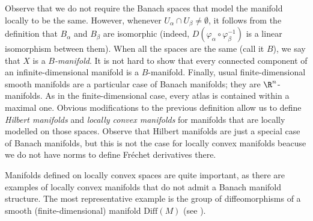 Observe that we do not require the Banach spaces that model the manifold locally to be the same. However, whenever \(U_\alpha \cap U_\beta \neq \emptyset\), it follows from the definition that \(B_\alpha\) and \(B_\beta\) are isomorphic (indeed, \(D(\varphi_\alpha \circ \varphi_\beta^{-1})\) is a linear isomorphism between them). When all the spaces are the same (call it \(B\)), we say that \(X\) is a \textit{\(B\)-manifold}. It is not hard to show that every connected component of an infinite-dimensional manifold is a \(B\)-manifold. Finally, usual finite-dimensional smooth manifolds are a particular case of Banach manifolds; they are \(\R^n\)-manifolds. As in the finite-dimensional case, every atlas is contained within a maximal one. Obvious modifications to the previous definition allow us to define \textit{Hilbert manifolds} and \textit{locally convex manifolds} for manifolds that are locally modelled on those spaces. Observe that Hilbert manifolds are just a special case of Banach manifolds, but this is not the case for locally convex manifolds beacuse we do not have norms to define Fréchet derivatives there. 

\begin{obs}
    Manifolds defined on locally convex spaces are quite important, as there are examples of locally convex manifolds that do not admit a Banach manifold structure. The most representative example is the group of diffeomorphisms of a smooth (finite-dimensional) manifold \(\mathrm{Diff}(M)\) (see \parencite{Schmeding_2022}). 
\end{obs}

